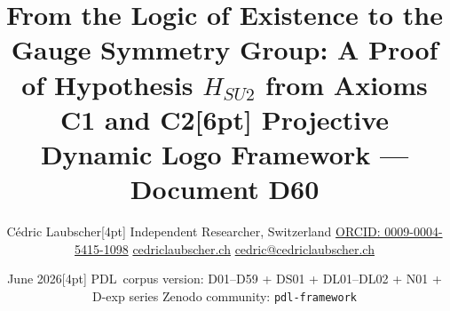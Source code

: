 \documentclass[11pt,a4paper]{article}
\def\\{}%
\def\PDL{PDL}%
\def\mathrm#1{#1}%
\def\textsc#1{#1}%
\theoremstyle{plain}
\theoremstyle{definition}
\theoremstyle{remark}
\newcommand{\PDL}{\textsc{PDL}}
\begin{document}

\title{\textbf{From the Logic of Existence to the Gauge Symmetry Group:\\
A Proof of Hypothesis $\mathrm{H_{SU2}}$ from Axioms C1 and C2}\\[6pt]
{\large Projective Dynamic Logo Framework --- Document D60}}

\author{C\'edric Laubscher\\[4pt]
\small Independent Researcher, Switzerland\\
\small \href{https://orcid.org/0009-0004-5415-1098}{ORCID: 0009-0004-5415-1098}\\
\small \href{https://cedriclaubscher.ch}{cedriclaubscher.ch}\\
\small \href{mailto:cedric@cedriclaubscher.ch}{cedric@cedriclaubscher.ch}}

\date{June 2026\\[4pt]
\small \PDL\ corpus version: D01--D59 + DS01 + DL01--DL02 + N01 + D-exp series\\
\small Zenodo community: \texttt{pdl-framework}}

\maketitle
\end{document}
